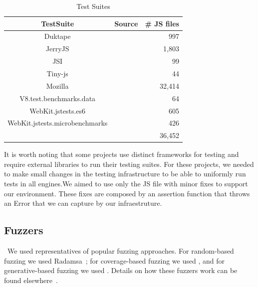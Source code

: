 \documentclass[10pt,conference,anonymous]{IEEEtran}
\begin{document}
\begin{table}[t]
  \centering
  \caption{\label{tab:test-suites}Test Suites}
  \begin{tabular}{ccr}
    \toprule
    TestSuite & Source & \# JS files \\
    \midrule
    Duktape & \cite{duktape} & 997 \\
    JerryJS & \cite{jerryscript} & 1,803 \\
    JSI & \cite{jsi} & 99 \\
    Tiny-js & \cite{tinyjs} & 44 \\
    Mozilla & \Fix{??} & 32,414 \\
    V8.test.benchmarks.data & \Fix{??} & 64 \\
    WebKit.jstests.es6 & \Fix{??} & 605 \\
    WebKit.jstests.microbenchmarks & \Fix{??} & 426 \\
    \midrule
     &  & 36,452 \\
   \bottomrule     
  \end{tabular}
\end{table}

It is worth noting that some projects use distinct frameworks for
testing and require external libraries to run their testing
suites. For these projects, we needed to make small changes in the testing
infrastructure to be able to uniformly run tests in all
engines.We aimed to use only the JS file with minor fixes
to support our environment. These fixes are composed by an assertion
function that throws an Error that we can capture by our
infraestruture.


\subsection{Fuzzers}
\label{sec:objects:fuzzers}

~We used representatives of popular fuzzing approaches. For
random-based fuzzing we used Radamsa~\cite{radamsa}; for
coverage-based fuzzing we used
, and for
generative-based fuzzing we used
. Details on how these fuzzers work can
be found elsewhere~\cite{fuzz-bart}.
\end{document}
